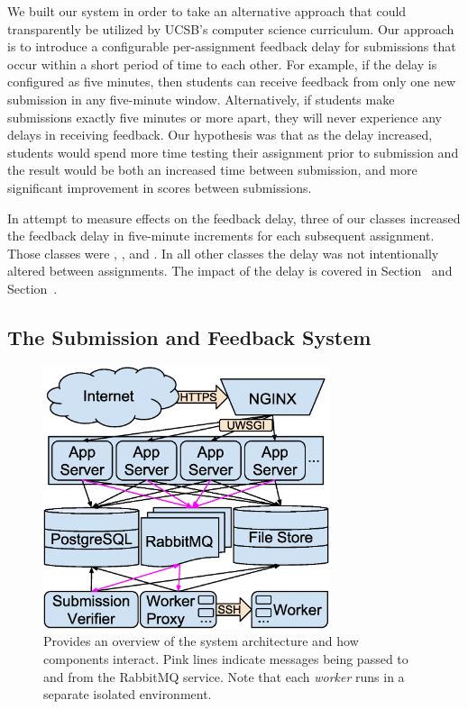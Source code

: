 We built our system in order to take an alternative approach that could
transparently be utilized by UCSB's computer science curriculum. Our approach
is to introduce a configurable per-assignment feedback delay for submissions
that occur within a short period of time to each other. For example, if the
delay is configured as five minutes, then students can receive feedback from
only one new submission in any five-minute window. Alternatively, if students
make submissions exactly five minutes or more apart, they will never experience
any delays in receiving feedback. Our hypothesis was that as the delay
increased, students would spend more time testing their assignment prior to
submission and the result would be both an increased time between submission,
and more significant improvement in scores between submissions.

In attempt to measure effects on the feedback delay, three of our classes
increased the feedback delay in five-minute increments for each subsequent
assignment. Those classes were , , and . In
all other classes the delay was not intentionally altered between
assignments. The impact of the delay is covered in
Section~ and Section~.


\subsection{The Submission and Feedback System}

\begin{figure}[!t]
\centering \includegraphics[width=3.3in]{graphs/architecture.eps}
\caption{Provides an overview of the system architecture and how components
  interact. Pink lines indicate messages being passed to and from the RabbitMQ
  service. Note that each \emph{worker} runs in a separate isolated
  environment.}
\end{figure}

